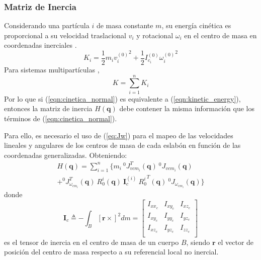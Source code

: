     \subsubsection{Matriz de Inercia}
    Considerando una partícula $i$ de masa constante $m$, su energía cinética es proporcional a su velocidad traslacional $v_i$ 
    y rotacional $\omega_i$ en el centro de masa en coordenadas inerciales \cite{theoretical_minimun}.
    \begin{equation}
        \label{eqn:cinetica_normal}
         K_i = \frac{1}{2} m_i {v_i^{(0)}}^2 + \frac{1}{2} I_{c_i}^{(0)} {\omega_i^{(0)}}^2 
    \end{equation}
    Para sistemas multipartículas \cite{rigid_multibody}, 
    \begin{equation}
        \label{eqn:cinetica_multi}
         K = \sum_{i=1}^n K_i
    \end{equation}
    Por lo que si (\ref{eqn:cinetica_normal}) es equivalente a (\ref{eqn:kinetic_energy}), entonces la matriz de inercia $H(\boldsymbol{q})$ debe 
    contener la misma información que los términos de (\ref{eqn:cinetica_normal}). 
    
    Para ello, es necesario el uso de (\ref{eq:Jw}) para el mapeo de las velocidades lineales y angulares de los centros de masa
    de cada eslabón en función de las coordenadas generalizadas. Obteniendo: 
    \begin{multline}
        \label{eqn:inertia_matrix}
        H(\boldsymbol{q}) = \sum_{i=1}^n \{ m_i \: ^0J_{v{cm_i}}^T(\boldsymbol{q}) \: ^0J_{v{cm_i}}(\boldsymbol{q}) \\ 
        + ^0J_{\omega_{cm_i}}^T (\boldsymbol{q}) \: R_0^i(\boldsymbol{q}) \: \boldsymbol{I}_c^{(i)} \: {R_0^i}^T (\boldsymbol{q}) \: {^0J_{\omega_{cm_i}}}(\boldsymbol{q}) \}
    \end{multline}
    donde 
    \begin{equation}
        \label{eqn:tensor_inercia}
        \boldsymbol{I}_c \triangleq - \int_B [\boldsymbol{r} \times]^2 dm  = 
        \begin{bmatrix}
            I_{xx_c} & I_{xy_c} & I_{xz_c} \\
            I_{xy_c} & I_{yy_c} & I_{yz_c} \\
            I_{xz_c} & I_{yz_c} & I_{zz_c} \\
        \end{bmatrix}
    \end{equation}
    es el tensor de inercia en el centro de masa de un cuerpo $B$, siendo $\boldsymbol{r}$ el vector de posición del centro de masa respecto a su referencial local no inercial.
    
